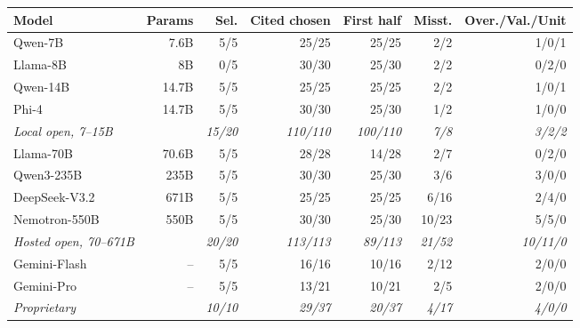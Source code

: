 \begin{tabular}{@{}lrrrrrr@{}}
\toprule
Model & Params & Sel. & Cited chosen & First half & Misst. & Over./Val./Unit \\
\midrule
Qwen-7B & 7.6B & 5/5 & 25/25 & 25/25 & 2/2 & 1/0/1 \\
Llama-8B & 8B & 0/5 & 30/30 & 25/30 & 2/2 & 0/2/0 \\
Qwen-14B & 14.7B & 5/5 & 25/25 & 25/25 & 2/2 & 1/0/1 \\
Phi-4 & 14.7B & 5/5 & 30/30 & 25/30 & 1/2 & 1/0/0 \\
\textit{Local open, 7--15B} & & \textit{15/20} & \textit{110/110} & \textit{100/110} & \textit{7/8} & \textit{3/2/2} \\
\midrule
Llama-70B & 70.6B & 5/5 & 28/28 & 14/28 & 2/7 & 0/2/0 \\
Qwen3-235B & 235B & 5/5 & 30/30 & 25/30 & 3/6 & 3/0/0 \\
DeepSeek-V3.2 & 671B & 5/5 & 25/25 & 25/25 & 6/16 & 2/4/0 \\
Nemotron-550B & 550B & 5/5 & 30/30 & 25/30 & 10/23 & 5/5/0 \\
\textit{Hosted open, 70--671B} & & \textit{20/20} & \textit{113/113} & \textit{89/113} & \textit{21/52} & \textit{10/11/0} \\
\midrule
Gemini-Flash & -- & 5/5 & 16/16 & 10/16 & 2/12 & 2/0/0 \\
Gemini-Pro & -- & 5/5 & 13/21 & 10/21 & 2/5 & 2/0/0 \\
\textit{Proprietary} & & \textit{10/10} & \textit{29/37} & \textit{20/37} & \textit{4/17} & \textit{4/0/0} \\
\bottomrule
\end{tabular}
